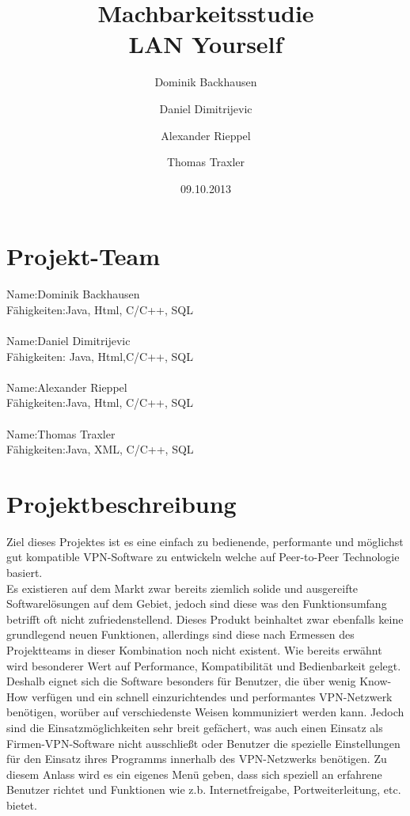 \documentclass[a4paper,12pt]{scrreprt}
\begin{document}
\author{Dominik Backhausen\and Daniel Dimitrijevic\and Alexander Rieppel\and Thomas Traxler}
\title{Machbarkeitsstudie\\ LAN Yourself}
\date{09.10.2013}
\maketitle
\tableofcontents



\chapter{Projekt-Team}
	
	Name:Dominik Backhausen\\
	    Fähigkeiten:Java, Html, C/C++, SQL\\\\
	  	Name:Daniel Dimitrijevic
	\\ 	Fähigkeiten: Java, Html,C/C++, SQL    
	\\
	\\  Name:Alexander Rieppel
	\\
	    Fähigkeiten:Java, Html, C/C++, SQL
	    \\
	    \\
	    Name:Thomas Traxler
	    \\
	    Fähigkeiten:Java, XML, C/C++, SQL
	    \\
\chapter{Projektbeschreibung}
Ziel dieses Projektes ist es eine einfach zu bedienende, performante und möglichst gut kompatible VPN-Software zu entwickeln welche auf Peer-to-Peer Technologie basiert.\\

Es existieren auf dem Markt zwar bereits ziemlich solide und ausgereifte Softwarelösungen auf dem Gebiet, jedoch sind diese was den Funktionsumfang betrifft oft nicht zufriedenstellend. Dieses Produkt beinhaltet zwar ebenfalls keine grundlegend neuen Funktionen, allerdings sind diese nach Ermessen des Projektteams in dieser Kombination noch nicht existent. Wie bereits erwähnt wird besonderer Wert auf Performance, Kompatibilität und Bedienbarkeit gelegt. Deshalb eignet sich die Software besonders für Benutzer, die über wenig Know-How verfügen und ein schnell einzurichtendes und performantes VPN-Netzwerk benötigen, worüber auf verschiedenste Weisen kommuniziert werden kann. Jedoch sind die Einsatzmöglichkeiten sehr breit gefächert, was auch einen Einsatz als Firmen-VPN-Software nicht ausschließt oder Benutzer die spezielle Einstellungen für den Einsatz ihres Programms innerhalb des VPN-Netzwerks benötigen. Zu diesem Anlass wird es ein eigenes Menü geben, dass sich speziell an erfahrene Benutzer richtet und Funktionen wie z.b. Internetfreigabe, Portweiterleitung, etc. bietet.\\
\end{document}
